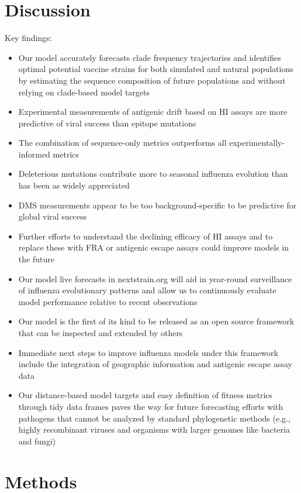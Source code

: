 \section*{Discussion}

Key findings:

\begin{itemize}
\item{Our model accurately forecasts clade frequency trajectories and identifies optimal potential vaccine strains for both simulated and natural populations by estimating the sequence composition of future populations and without relying on clade-based model targets}
\item{Experimental measurements of antigenic drift based on HI assays are more predictive of viral success than epitope mutations}
\item{The combination of sequence-only metrics outperforms all experimentally-informed metrics}
\item{Deleterious mutations contribute more to seasonal influenza evolution than has been as widely appreciated}
\item{DMS measurements appear to be too background-specific to be predictive for global viral success}
\item{Further efforts to understand the declining efficacy of HI assays and to replace these with FRA or antigenic escape assays could improve models in the future}
\item{Our model live forecasts in nextstrain.org will aid in year-round surveillance of influenza evolutionary patterns and allow us to continuously evaluate model performance relative to recent observations}
\item{Our model is the first of its kind to be released as an open source framework that can be inspected and extended by others}
\item{Immediate next steps to improve influenza models under this framework include the integration of geographic information and antigenic escape assay data}
\item{Our distance-based model targets and easy definition of fitness metrics through tidy data frames paves the way for future forecasting efforts with pathogens that cannot be analyzed by standard phylogenetic methods (e.g., highly recombinant viruses and organisms with larger genomes like bacteria and fungi)}
\end{itemize}

\section*{Methods}

